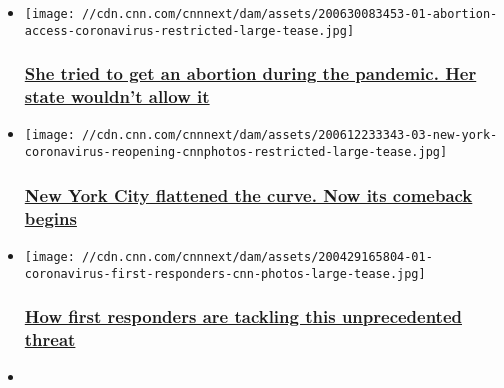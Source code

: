 \begin{itemize}
\item
  \href{https://www.cnn.com/interactive/2020/06/health/abortion-access-coronavirus-cnnphotos/index.html}{}

  \texttt{[image: //cdn.cnn.com/cnnnext/dam/assets/200630083453-01-abortion-access-coronavirus-restricted-large-tease.jpg]}

  \hypertarget{she-tried-to-get-an-abortion-during-the-pandemic-her-state-wouldnt-allow-it}{%
  \subsubsection{\texorpdfstring{\href{https://www.cnn.com/interactive/2020/06/health/abortion-access-coronavirus-cnnphotos/index.html}{She
  tried to get an abortion during the pandemic. Her state wouldn't allow
  it}}{She tried to get an abortion during the pandemic. Her state wouldn't allow it}}\label{she-tried-to-get-an-abortion-during-the-pandemic-her-state-wouldnt-allow-it}}
\item
  \href{https://www.cnn.com/interactive/2020/06/us/new-york-coronavirus-reopening-cnnphotos/index.html}{}

  \texttt{[image: //cdn.cnn.com/cnnnext/dam/assets/200612233343-03-new-york-coronavirus-reopening-cnnphotos-restricted-large-tease.jpg]}

  \hypertarget{new-york-city-flattened-the-curve-now-its-comeback-begins}{%
  \subsubsection{\texorpdfstring{\href{https://www.cnn.com/interactive/2020/06/us/new-york-coronavirus-reopening-cnnphotos/index.html}{New
  York City flattened the curve. Now its comeback
  begins}}{New York City flattened the curve. Now its comeback begins}}\label{new-york-city-flattened-the-curve-now-its-comeback-begins}}
\item
  \href{https://www.cnn.com/interactive/2020/04/health/coronavirus-first-responders-cnnphotos/index.html}{}

  \texttt{[image: //cdn.cnn.com/cnnnext/dam/assets/200429165804-01-coronavirus-first-responders-cnn-photos-large-tease.jpg]}

  \hypertarget{how-first-responders-are-tackling-this-unprecedented-threat}{%
  \subsubsection{\texorpdfstring{\href{https://www.cnn.com/interactive/2020/04/health/coronavirus-first-responders-cnnphotos/index.html}{How
  first responders are tackling this unprecedented
  threat}}{How first responders are tackling this unprecedented threat}}\label{how-first-responders-are-tackling-this-unprecedented-threat}}
\item
  \href{https://www.cnn.com/interactive/2020/04/world/wuhan-coronavirus-cnnphotos/index.html}{}


\end{itemize}
